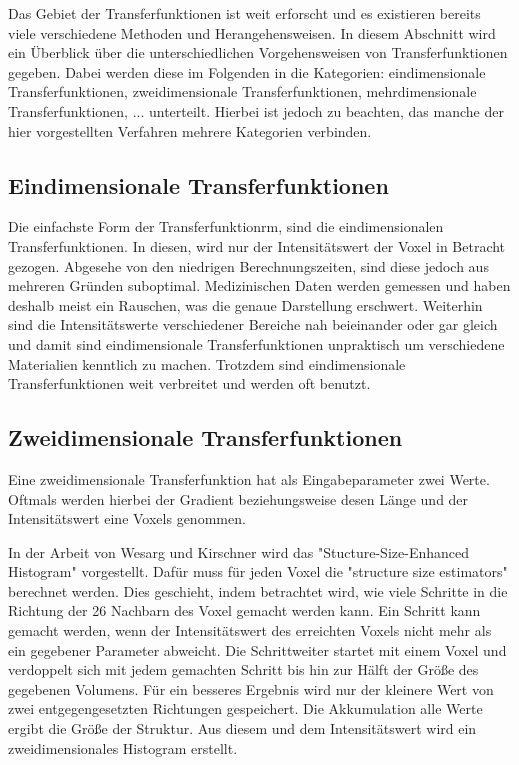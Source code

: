 Das Gebiet der Transferfunktionen ist weit erforscht und es existieren bereits viele verschiedene Methoden und Herangehensweisen. In diesem Abschnitt wird ein Überblick über die unterschiedlichen Vorgehensweisen von Transferfunktionen gegeben. Dabei werden diese im Folgenden in die Kategorien: eindimensionale Transferfunktionen, zweidimensionale Transferfunktionen, mehrdimensionale Transferfunktionen, ... unterteilt. Hierbei ist jedoch zu beachten, das manche der hier vorgestellten Verfahren mehrere Kategorien verbinden.


\subsection{Eindimensionale Transferfunktionen}

Die einfachste Form der Transferfunktionrm, sind die eindimensionalen Transferfunktionen. In diesen, wird nur der Intensitätswert der Voxel in Betracht gezogen. Abgesehe von den niedrigen Berechnungszeiten, sind diese jedoch aus mehreren Gründen suboptimal. Medizinischen Daten werden gemessen und haben deshalb meist ein Rauschen, was die genaue Darstellung erschwert. Weiterhin sind die Intensitätswerte verschiedener Bereiche nah beieinander oder gar gleich und damit sind eindimensionale Transferfunktionen unpraktisch um verschiedene Materialien kenntlich zu machen. Trotzdem sind eindimensionale Transferfunktionen weit verbreitet und werden oft benutzt. 
\newline




\subsection{Zweidimensionale Transferfunktionen}

Eine zweidimensionale Transferfunktion hat als Eingabeparameter zwei Werte. Oftmals werden hierbei der Gradient beziehungsweise desen Länge und der Intensitätswert eine Voxels genommen.


In der Arbeit von Wesarg und Kirschner \cite{wesarg2009structure, wesarg20102d} wird das "Stucture-Size-Enhanced Histogram" vorgestellt.
\newline
Dafür muss für jeden Voxel die "structure size estimators" berechnet werden. Dies geschieht, indem betrachtet wird, wie viele Schritte in die Richtung der 26 Nachbarn des Voxel gemacht werden kann. Ein Schritt kann gemacht werden, wenn der Intensitätswert des erreichten Voxels nicht mehr als ein gegebener Parameter abweicht. Die Schrittweiter startet mit einem Voxel und verdoppelt sich mit jedem gemachten Schritt bis hin zur Hälft der Größe des gegebenen Volumens. Für ein besseres Ergebnis wird nur der kleinere Wert von zwei entgegengesetzten Richtungen gespeichert. Die Akkumulation alle Werte ergibt die Größe der Struktur. Aus diesem und dem Intensitätswert wird ein zweidimensionales Histogram erstellt.





